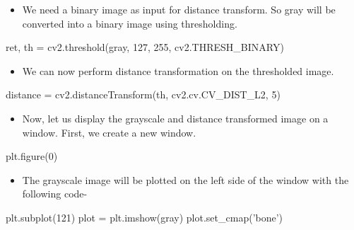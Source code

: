 \documentclass[]{article}
\newenvironment{Shaded}{}{}
\newcommand{\DecValTok}[1]{\textcolor[rgb]{0.25,0.63,0.44}{{#1}}}
\newcommand{\StringTok}[1]{\textcolor[rgb]{0.25,0.44,0.63}{{#1}}}
\newcommand{\OperatorTok}[1]{\textcolor[rgb]{0.40,0.40,0.40}{{#1}}}
\newcommand{\NormalTok}[1]{{#1}}
\providecommand{\tightlist}{%
  \setlength{\itemsep}{0pt}\setlength{\parskip}{0pt}}
\begin{document}
\begin{itemize}
\tightlist
\item
  We need a binary image as input for distance transform. So gray will
  be converted into a binary image using thresholding.
\end{itemize}

\begin{Shaded}
\begin{Highlighting}[]
    \NormalTok{ret, th }\OperatorTok{=} \NormalTok{cv2.threshold(gray, }\DecValTok{127}\NormalTok{, }\DecValTok{255}\NormalTok{, cv2.THRESH_BINARY)}
\end{Highlighting}
\end{Shaded}

\begin{itemize}
\tightlist
\item
  We can now perform distance transformation on the thresholded image.
\end{itemize}

\begin{Shaded}
\begin{Highlighting}[]
    \NormalTok{distance }\OperatorTok{=} \NormalTok{cv2.distanceTransform(th, cv2.cv.CV_DIST_L2, }\DecValTok{5}\NormalTok{)}
\end{Highlighting}
\end{Shaded}

\begin{itemize}
\tightlist
\item
  Now, let us display the grayscale and distance transformed image on a
  window. First, we create a new window.
\end{itemize}

\begin{Shaded}
\begin{Highlighting}[]
    \NormalTok{plt.figure(}\DecValTok{0}\NormalTok{)}
\end{Highlighting}
\end{Shaded}

\begin{itemize}
\tightlist
\item
  The grayscale image will be plotted on the left side of the window
  with the following code-
\end{itemize}

\begin{Shaded}
\begin{Highlighting}[]
    \NormalTok{plt.subplot(}\DecValTok{121}\NormalTok{)}
    \NormalTok{plot }\OperatorTok{=} \NormalTok{plt.imshow(gray)}
    \NormalTok{plot.set_cmap(}\StringTok{'bone'}\NormalTok{)}
\end{Highlighting}
\end{Shaded}
\end{document}
